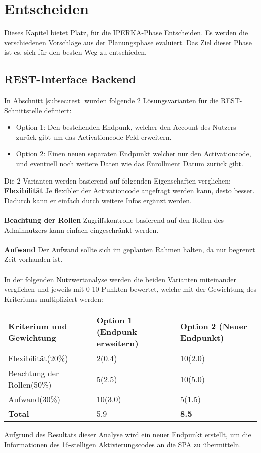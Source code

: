 \chapter{Entscheiden}\label{ch:entscheiden}
Dieses Kapitel bietet Platz, für die IPERKA-Phase \flqq Entscheiden\frqq{}. Es werden die verschiedenen Vorschläge aus der Planungsphase evaluiert. Das Ziel dieser Phase ist es, sich für den besten Weg zu entschieden.
\section{REST-Interface Backend}
In Abschnitt \ref{subsec:rest} wurden folgende 2 Lösungsvarianten für die REST-Schnittstelle definiert:
\begin{itemize}
	\item{Option 1:} Den bestehenden Endpunk, welcher den Account des Nutzers zurück gibt um das Activationcode Feld erweitern.
	\item{Option 2:} Einen neuen separaten Endpunkt welcher nur den Activationcode, und eventuell noch weitere Daten wie das Enrollment Datum zurück gibt.
\end{itemize}
Die 2 Varianten werden basierend auf folgenden Eigenschaften verglichen:
\newline\\
\textbf{Flexibilität} Je flexibler der Activationcode angefragt werden kann, desto besser. Dadurch kann er einfach durch weitere Infos ergänzt werden.\\\\
\textbf{Beachtung der Rollen} Zugriffskontrolle basierend auf den Rollen des Adminnutzers kann einfach eingeschränkt werden.
\\\\
\textbf{Aufwand} Der Aufwand sollte sich im geplanten Rahmen halten, da nur begrenzt Zeit vorhanden ist.
\\
\\
In der folgenden Nutzwertanalyse werden die beiden Varianten miteinander verglichen und jeweils mit 0-10 Punkten bewertet, welche mit der Gewichtung des Kriteriums multipliziert werden:
\begin{longtable}{|p{}|p{}|p{}|}
	\hline
	\textbf{Kriterium und Gewichtung} & \textbf{Option 1 (Endpunk erweitern)} & \textbf{Option 2 (Neuer Endpunkt)} \\ \hline
	Flexibilität(20\%)& 2(0.4)  & 10(2.0)    \\ \hline 
	Beachtung der Rollen(50\%) & 5(2.5)  &  10(5.0)   \\ \hline 
	Aufwand(30\%) & 10(3.0)  &  5(1.5)   \\ \hline 
	\textbf{Total} & 5.9  &  \textbf{8.5} \\ \hline 
\end{longtable}
\noindent Aufgrund des Resultats dieser Analyse wird ein neuer Endpunkt erstellt, um die Informationen des 16-stelligen Aktivierungscodes an die SPA zu übermitteln.

